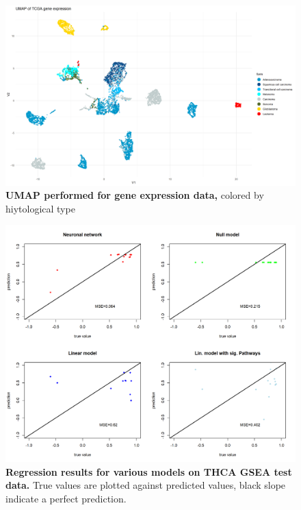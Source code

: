 \documentclass[
  11pt,
  parskip,
  oneside]{scrreprt}
\begin{document}
\begin{figure}

{\centering \includegraphics[width=1\linewidth]{figures/Pan Cancer Geneexpression UMAP cancer form} 

}

\caption{\textbf{UMAP performed for gene expression data,} colored by hiytological type}\label{fig:UMAPGenform}
\end{figure}

\begin{figure}

{\centering \includegraphics[width=0.8\linewidth]{figures/Regression comparison plot IL36 genes} 

}

\caption{\textbf{Regression results for various models on THCA GSEA test data.} True values are plotted against predicted values, black slope indicate a perfect prediction.}\label{fig:reg}
\end{figure}
\end{document}
